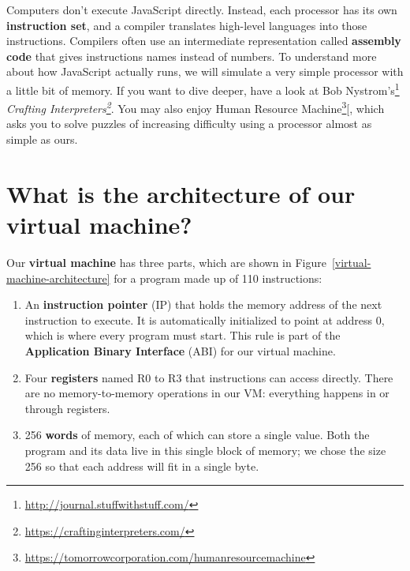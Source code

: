 \documentclass[krantzl]{krantz}
\newcommand{\figref}[1]{Figure~\ref{#1}}
\newcommand{\glossref}[1]{\textbf{#1}}
\newcommand{\hreffoot}[2]{{#1}\footnote{\href{#2}{#2}}}
\begin{document}
Computers don’t execute JavaScript directly.
Instead,
each processor has its own \glossref{instruction set},
and a compiler translates high-level languages into those instructions.
Compilers often use an intermediate representation called \glossref{assembly code}
that gives instructions names instead of numbers.
To understand more about how JavaScript actually runs,
we will simulate a very simple processor with a little bit of memory.
If you want to dive deeper,
have a look at \hreffoot{Bob Nystrom’s}{http://journal.stuffwithstuff.com/} \emph{\hreffoot{Crafting Interpreters}{https://craftinginterpreters.com/}}.
You may also enjoy \hreffoot{Human Resource Machine}{https://tomorrowcorporation.com/humanresourcemachine}[,
which asks you to solve puzzles of increasing difficulty
using a processor almost as simple as ours.

\section{What is the architecture of our virtual machine?}\label{virtual-machine-arch}


Our \glossref{virtual machine} has three parts,
which are shown in \figref{virtual-machine-architecture}
for a program made up of 110 instructions:

\begin{enumerate}

\item 

An \glossref{instruction pointer} (IP)
    that holds the memory address of the next instruction to execute.
    It is automatically initialized to point at address 0,
    which is where every program must start.
    This rule is part of the \glossref{Application Binary Interface} (ABI)
    for our virtual machine.



\item 

Four \glossref{registers} named R0 to R3 that instructions can access directly.
    There are no memory-to-memory operations in our VM:
    everything  happens in or through registers.



\item 

256 \glossref{words} of memory, each of which can store a single value.
    Both the program and its data live in this single block of memory;
    we chose the size 256 so that each address will fit in a single byte.



\end{enumerate}
\end{document}
